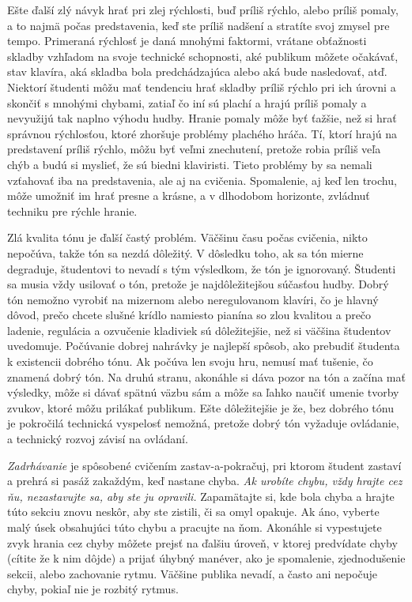 Ešte ďalší zlý návyk hrať pri zlej rýchlosti, buď príliš rýchlo, alebo príliš pomaly, a to najmä počas predstavenia, keď ste príliš nadšení a stratíte svoj zmysel pre tempo. Primeraná rýchlosť je daná mnohými faktormi, vrátane obťažnosti skladby vzhľadom na svoje technické schopnosti, aké publikum môžete očakávať, stav klavíra, aká skladba bola predchádzajúca alebo aká bude nasledovať, atď. Niektorí študenti môžu mať tendenciu hrať skladby príliš rýchlo pri ich úrovni a skončiť s mnohými chybami, zatiaľ čo iní sú plachí a hrajú príliš pomaly a nevyužijú tak naplno výhodu hudby. Hranie pomaly môže byť ťažšie, než si hrať správnou rýchlosťou, ktoré zhoršuje problémy plachého hráča. Tí, ktorí hrajú na predstavení príliš rýchlo, môžu byť veľmi znechutení, pretože robia príliš veľa chýb a budú si myslieť, že sú biedni klaviristi. Tieto problémy by sa nemali vzťahovať iba na predstavenia, ale aj na cvičenia. Spomalenie, aj keď len trochu, môže umožniť im hrať presne a krásne, a v dlhodobom horizonte, zvládnuť techniku pre rýchle hranie.

Zlá kvalita tónu je ďalší častý problém. Väčšinu času počas cvičenia, nikto nepočúva, takže tón sa nezdá dôležitý. V dôsledku toho, ak sa tón mierne degraduje, študentovi to nevadí s tým výsledkom, že tón je ignorovaný. Študenti sa musia vždy usilovať o tón, pretože je najdôležitejšou súčasťou hudby. Dobrý tón nemožno vyrobiť na mizernom alebo neregulovanom klavíri, čo je hlavný dôvod, prečo chcete slušné krídlo namiesto pianína so zlou kvalitou a prečo ladenie, regulácia a ozvučenie kladiviek sú dôležitejšie, než si väčšina študentov uvedomuje. Počúvanie dobrej nahrávky je najlepší spôsob, ako prebudiť študenta k existencii dobrého tónu. Ak počúva len svoju hru, nemusí mať tušenie, čo znamená dobrý tón. Na druhú stranu, akonáhle si dáva pozor na tón a začína mať výsledky, môže si dávať spätnú väzbu sám a môže sa ľahko naučiť umenie tvorby zvukov, ktoré môžu prilákať publikum. Ešte dôležitejšie je že, bez dobrého tónu je pokročilá technická vyspelosť nemožná, pretože dobrý tón vyžaduje ovládanie, a technický rozvoj závisí na ovládaní.

\emph{Zadrhávanie} je spôsobené cvičením zastav-a-pokračuj, pri ktorom študent zastaví a prehrá si pasáž zakaždým, keď nastane chyba. \emph{Ak urobíte chybu, vždy hrajte cez ňu, nezastavujte sa, aby ste ju opravili.} Zapamätajte si, kde bola chyba a hrajte túto sekciu znovu neskôr, aby ste zistili, či sa omyl opakuje. Ak áno, vyberte malý úsek obsahujúci túto chybu a pracujte na ňom. Akonáhle  si vypestujete zvyk hrania cez chyby môžete prejsť na ďalšiu úroveň, v ktorej predvídate chyby (cítite že k nim dôjde) a prijať úhybný manéver, ako je spomalenie, zjednodušenie sekcii, alebo zachovanie rytmu. Väčšine publika nevadí, a často ani nepočuje chyby, pokiaľ nie je rozbitý rytmus.

